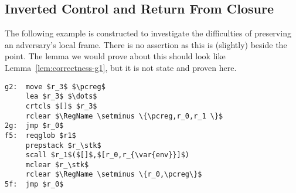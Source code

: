 \documentclass[a4paper]{article}
\newcommand{\var}[1]{\mathit{#1}}
\newcommand{\pcreg}{\mathrm{pc}}
\newcommand{\adv}{\var{adv}}
\newcommand{\stk}{\var{stk}}
\newcommand{\plaindom}[1]{\mathrm{#1}}
\newcommand{\RegName}{\plaindom{RegisterName}}
\begin{document}
\begin{comment}
          \cline{2-2}
          $r_{\var{stk}}$  & $c_{\var{stk}}'$ \\
          \cline{2-2}
                   & $0$ \\
          \cline{2-2}
                   & $\vdots$ \\
          \cline{2-2}
        \end{tabular}
        \caption{Stack and register-file just after second jump to $\adv$.}
        \label{fig:f3-stack-before-snd-adv}
      \end{figure}
    \end{enumproof}
  \end{enumproof}
\end{proof}
\end{comment}


\subsection{Inverted Control and Return From Closure}
The following example is constructed to investigate the difficulties of preserving an adversary's local frame. There is no assertion as this is (slightly) beside the point. The lemma we would prove about this should look like Lemma~\ref{lem:correctness-g1}, but it is not state and proven here.
\begin{lstlisting}
g2:  move $r_3$ $\pcreg$
     lea $r_3$ $\dots$
     crtcls $[]$ $r_3$
     rclear $\RegName \setminus \{\pcreg,r_0,r_1 \}$
2g:  jmp $r_0$
f5:  reqglob $r1$
     prepstack $r_\stk$
     scall $r_1$($[]$,$[r_0,r_{\var{env}}]$)
     mclear $r_\stk$
     rclear $\RegName \setminus \{r_0,\pcreg\}$
5f:  jmp $r_0$
\end{lstlisting}
\end{document}

